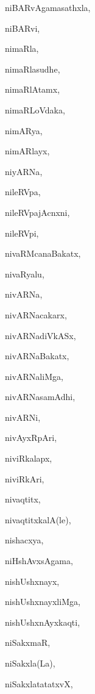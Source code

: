 \begin{multicols}{2}
{niBARvAgamasathxla}, \pageref{niBARvAgamasathxla}

{niBARvi}, \pageref{niBARvi}

{nimaRla}, \pageref{nimaRla}

{nimaRlasudhe}, \pageref{nimaRlasudhe}

{nimaRlAtamx}, \pageref{nimaRlAtamx}

{nimaRLoVdaka}, \pageref{nimaRLoVdaka}

{nimARya}, \pageref{nimARya}

{nimARlayx}, \pageref{nimARlayx}

{niyARNa}, \pageref{niyARNa}

{nileRVpa}, \pageref{nileRVpa}

{nileRVpajAcnxni}, \pageref{nileRVpajAcnxni}

{nileRVpi}, \pageref{nileRVpi}

{nivaRMcanaBakatx}, \pageref{nivaRMcanaBakatx}

{nivaRyalu}, \pageref{nivaRyalu}

{nivARNa}, \pageref{nivARNa}

{nivARNacakarx}, \pageref{nivARNacakarx}

{nivARNadiVkASx}, \pageref{nivARNadiVkASx}

{nivARNaBakatx}, \pageref{nivARNaBakatx}

{nivARNaliMga}, \pageref{nivARNaliMga}

{nivARNasamAdhi}, \pageref{nivARNasamAdhi}

{nivARNi}, \pageref{nivARNi}

{nivAyxRpAri}, \pageref{nivAyxRpAri}

{niviRkalapx}, \pageref{niviRkalapx}

{niviRkAri}, \pageref{niviRkAri}

{nivaqtitx}, \pageref{nivaqtitx}

{nivaqtitxkalA(le)}, \pageref{nivaqtitxkalAle}

{nishacxya}, \pageref{nishacxya}

{niHshAvxsAgama}, \pageref{niHshAvxsAgama}

{nishUshxnayx}, \pageref{nishUshxnayx}

{nishUshxnayxliMga}, \pageref{nishUshxnayxliMga}

{nishUshxnAyxkaqti}, \pageref{nishUshxnAyxkaqti}

{niSakxmaR}, \pageref{niSakxmaR}

{niSakxla(La)}, \pageref{niSakxlaLa}

{niSakxlatatatxvX}, \pageref{niSakxlatatatxvX}


\end{multicols}

